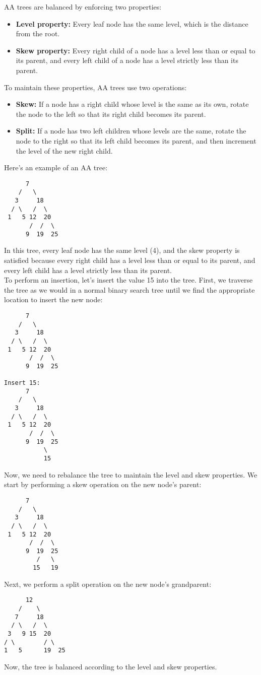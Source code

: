 \documentclass{article}
\begin{document}
AA trees are balanced by enforcing two properties:
\begin{itemize}
    \item \textbf{Level property:} Every leaf node has the same level, which is the distance from the root.
    \item \textbf{Skew property:} Every right child of a node has a level less than or equal to its parent, and every left child of a node has a level strictly less than its parent.
\end{itemize}
To maintain these properties, AA trees use two operations:
\begin{itemize}
    \item \textbf{Skew:} If a node has a right child whose level is the same as its own, rotate the node to the left so that its right child becomes its parent.
    \item \textbf{Split:} If a node has two left children whose levels are the same, rotate the node to the right so that its left child becomes its parent, and then increment the level of the new right child.
\end{itemize}
Here's an example of an AA tree:
\begin{lstlisting}
      7
    /   \
   3     18
  / \   /  \
 1   5 12  20
       /  /  \
      9  19  25

\end{lstlisting}
In this tree, every leaf node has the same level (4), and the skew property is satisfied because every right child has a level less than or equal to its parent, and every left child has a level strictly less than its parent.\\

To perform an insertion, let's insert the value 15 into the tree. First, we traverse the tree as we would in a normal binary search tree until we find the appropriate location to insert the new node:
\begin{lstlisting}
      7
    /   \
   3     18
  / \   /  \
 1   5 12  20
       /  /  \
      9  19  25

Insert 15:
      7
    /   \
   3     18
  / \   /  \
 1   5 12  20
       /  /  \
      9  19  25
           \
           15

\end{lstlisting}
Now, we need to rebalance the tree to maintain the level and skew properties. We start by performing a skew operation on the new node's parent:
\begin{lstlisting}
      7
    /   \
   3     18
  / \   /  \
 1   5 12  20
       /  /  \
      9  19  25
         /   \
        15   19

\end{lstlisting}
Next, we perform a split operation on the new node's grandparent:
\begin{lstlisting}
      12
    /    \
   7     18
  / \   /  \
 3   9 15  20
/ \        / \
1   5      19  25

\end{lstlisting}
Now, the tree is balanced according to the level and skew properties.
\end{document}
